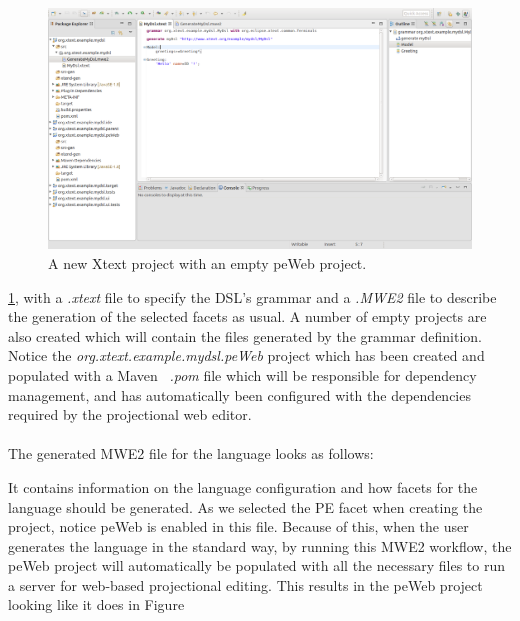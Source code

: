 \documentclass{article}
\begin{document}
\begin{figure}[h!]
  \includegraphics[width=\linewidth]{./Screenshots/newProjectScreen.png}
  \caption{A new Xtext project with an empty peWeb project.}
  \label{fig:newProjectScreen}
\end{figure} \ref{fig:newProjectScreen}, with a \emph{.xtext} file to specify the DSL's grammar and a \emph{.MWE2} file to describe the generation of the selected facets as usual. A number of empty projects are also created which will contain the files generated by the grammar definition. Notice the \emph{org.xtext.example.mydsl.peWeb} project which has been created and populated with a Maven~\cite{maven} \emph{.pom} file which will be responsible for dependency management, and has automatically been configured with the dependencies required by the projectional web editor. 
\\
\\
The generated MWE2 file for the language looks as follows:

It contains information on the language configuration and how facets for the language should be generated. As we selected the PE facet when creating the project, notice peWeb is enabled in this file. Because of this, when the user generates the language in the standard way, by running this MWE2 workflow, the peWeb project will automatically be populated with all the necessary files to run a server for web-based projectional editing. This results in the peWeb project looking like it does in Figure 
\end{document}
